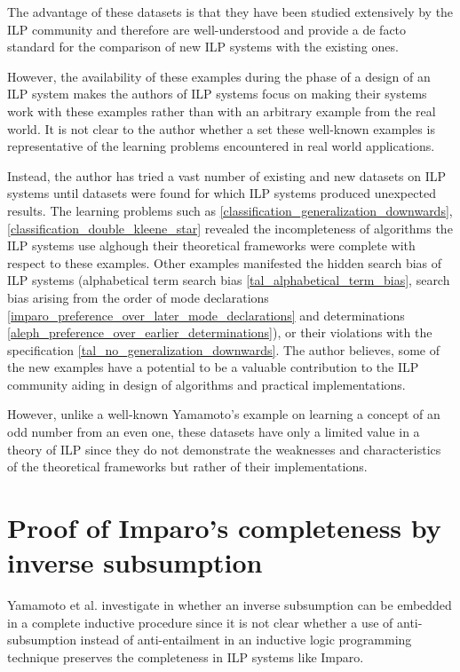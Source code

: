 The advantage of these datasets is that they have been studied extensively by the ILP community and therefore are well-understood and provide a de facto standard for the comparison of new ILP systems with the existing ones.

However, the availability of these examples during the phase of a design of an ILP system makes the authors of ILP systems focus on making their systems work with these examples rather than with an arbitrary example from the real world. It is not clear to the author whether a set these well-known examples is representative of the learning problems encountered in real world applications.

Instead, the author has tried a vast number of existing and new datasets on ILP systems until datasets were found for which ILP systems produced unexpected results. The learning problems such as \ref{classification_generalization_downwards}, \ref{classification_double_kleene_star} revealed the incompleteness of algorithms the ILP systems use alghough their theoretical frameworks were complete with respect to these examples. Other examples manifested the hidden search bias of ILP systems (alphabetical term search bias \ref{tal_alphabetical_term_bias}, search bias arising from the order of mode declarations \ref{imparo_preference_over_later_mode_declarations} and determinations \ref{aleph_preference_over_earlier_determinations}), or their violations with the specification \ref{tal_no_generalization_downwards}. The author believes, some of the new examples have a potential to be a valuable contribution to the ILP community aiding in design of algorithms and practical implementations.

However, unlike a well-known Yamamoto's example \cite{yamamoto1997hypotheses} on learning a concept of an odd number from an even one, these datasets have only a limited value in a theory of ILP since they do not demonstrate the weaknesses and characteristics of the theoretical frameworks but rather of their implementations. 

\section{Proof of Imparo's completeness by inverse subsumption}
Yamamoto et al. investigate in \cite{yamamoto2012inverse} whether an inverse subsumption can be embedded in a complete inductive procedure since it is not clear whether a use of anti-subsumption instead of anti-entailment in an inductive logic programming technique preserves the completeness in ILP systems like Imparo.

